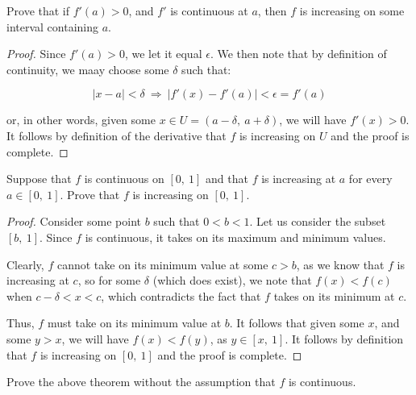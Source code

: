 \documentclass[10pt, oneside]{amsart}
\newenvironment{problem}[2][Problem]{\begin{trivlist}
\item[\hskip \labelsep {\bfseries #1}\hskip \labelsep {\bfseries #2.}]}{\end{trivlist}}
\begin{document}
    \begin{problem}{11.63a}
      Prove that if $f'(a) > 0$, and $f'$ is continuous at $a$, then $f$ is increasing on some interval containing $a$.
    \end{problem}

    \begin{proof}
      Since $f'(a) > 0$, we let it equal $\epsilon$. We then note that by definition of continuity, we maay choose some $\delta$ such that:

      $$|x - a| < \delta \ \Rightarrow \ |f'(x) - f'(a)| < \epsilon = f'(a)$$

      or, in other words, given some $x \in U = (a - \delta, \ a + \delta)$, we will have $f'(x) > 0$. It follows by definition of the derivative that $f$
      is increasing on $U$ and the proof is complete.
    \end{proof}

    \begin{problem}{11.63b}
      
    \end{problem}

    \begin{problem}{11.65a}
      Suppose that $f$ is continuous on $[0, \ 1]$ and that $f$ is increasing at $a$ for every $a \in [0, \ 1]$. Prove that $f$ is increasing
      on $[0, \ 1]$.
    \end{problem}

    \begin{proof}
      Consider some point $b$ such that $0 < b < 1$. Let us consider the subset $[b, \ 1]$. Since $f$ is continuous, it takes on its maximum
      and minimum values.
      \newline

      Clearly, $f$ cannot take on its minimum value at some $c > b$, as we know that $f$ is increasing at $c$, so for
      some $\delta$ (which does exist), we note that $f(x) < f(c)$ when $c - \delta < x < c$, which contradicts the fact that $f$ takes on its minimum at $c$.
      \newline

      Thus, $f$ must take on its minimum value at $b$. It follows that given some $x$, and some $y > x$, we will have $f(x) < f(y)$, as $y \in [x, \ 1]$. It follows by definition that
      $f$ is increasing on $[0, \ 1]$ and the proof is complete.
    \end{proof}

    \begin{problem}{11.65b}
      Prove the above theorem without the assumption that $f$ is continuous.
    \end{problem}
\end{document}
